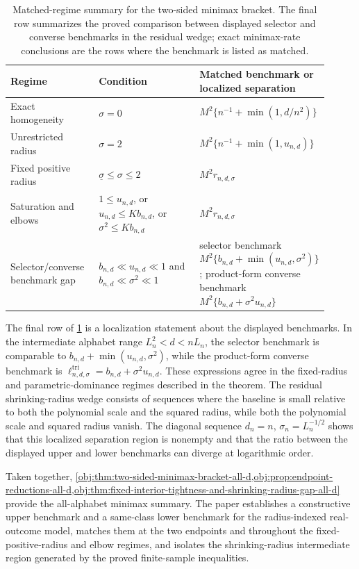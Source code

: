 \documentclass[11pt]{article}
\begin{document}
\begin{table}[t]
\centering
\begin{tabular}{p{0.28\linewidth}p{0.33\linewidth}p{0.30\linewidth}}
\hline
Regime & Condition & Matched benchmark or localized separation \\
\hline
Exact homogeneity & \(\sigma=0\) & \(M^2\{n^{-1}+\min(1,d/n^2)\}\) \\
Unrestricted radius & \(\sigma=2\) & \(M^2\{n^{-1}+\min(1,u_{n,d})\}\) \\
Fixed positive radius & \(\underline\sigma\le\sigma\le2\) & \(M^2r_{n,d,\sigma}\) \\
Saturation and elbows & \(1\le u_{n,d}\), or \(u_{n,d}\le Kb_{n,d}\), or \(\sigma^2\le Kb_{n,d}\) & \(M^2r_{n,d,\sigma}\) \\
Selector/converse benchmark gap & \(b_{n,d}\ll u_{n,d}\ll1\) and \(b_{n,d}\ll\sigma^2\ll1\) & selector benchmark \(M^2\{b_{n,d}+\min(u_{n,d},\sigma^2)\}\); product-form converse benchmark \(M^2\{b_{n,d}+\sigma^2u_{n,d}\}\) \\
\hline
\end{tabular}
\caption{Matched-regime summary for the two-sided minimax bracket. The final row summarizes the proved comparison between displayed selector and converse benchmarks in the residual wedge; exact minimax-rate conclusions are the rows where the benchmark is listed as matched.}
\label{tab:matched-regimes}
\end{table}

The final row of \cref{tab:matched-regimes} is a localization statement about the displayed benchmarks. In the intermediate alphabet range \(L_n^2<d<nL_n\), the selector benchmark is comparable to \(b_{n,d}+\min(u_{n,d},\sigma^2)\), while the product-form converse benchmark is \(\ell^{\mathrm{tri}}_{n,d,\sigma}=b_{n,d}+\sigma^2u_{n,d}\). These expressions agree in the fixed-radius and parametric-dominance regimes described in the theorem. The residual shrinking-radius wedge consists of sequences where the baseline is small relative to both the polynomial scale and the squared radius, while both the polynomial scale and squared radius vanish. The diagonal sequence \(d_n=n\), \(\sigma_n=L_n^{-1/2}\) shows that this localized separation region is nonempty and that the ratio between the displayed upper and lower benchmarks can diverge at logarithmic order.

Taken together, \cref{obj:thm:two-sided-minimax-bracket-all-d,obj:prop:endpoint-reductions-all-d,obj:thm:fixed-interior-tightness-and-shrinking-radius-gap-all-d} provide the all-alphabet minimax summary. The paper establishes a constructive upper benchmark and a same-class lower benchmark for the radius-indexed real-outcome model, matches them at the two endpoints and throughout the fixed-positive-radius and elbow regimes, and isolates the shrinking-radius intermediate region generated by the proved finite-sample inequalities.
\end{document}
